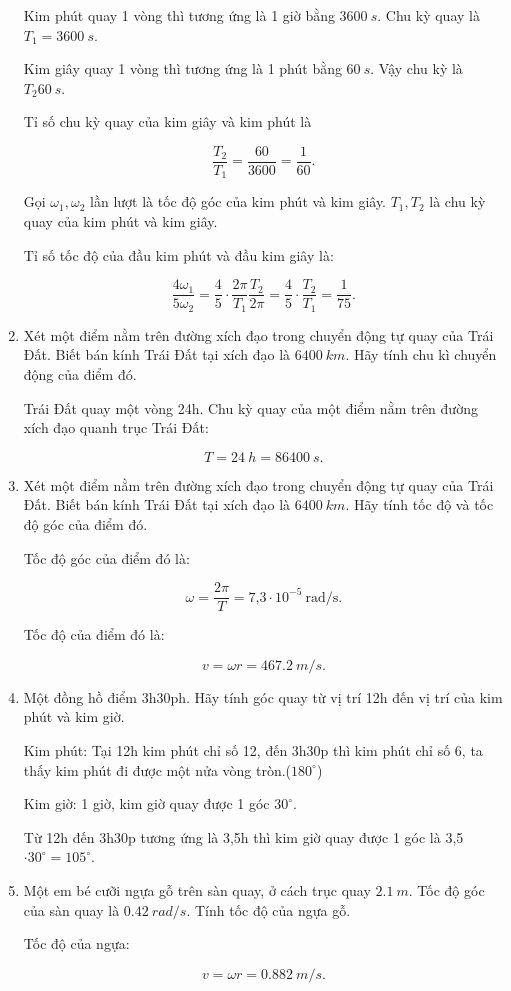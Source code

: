 \begin{enumerate}[label=\bfseries Câu \arabic*:]
	\hideall
	{	
		Kim phút quay 1 vòng thì tương ứng là 1 giờ bằng $\SI{3600}{s}$. Chu kỳ quay là $T_1=\SI{3600}{s}$.
		
		Kim giây quay 1 vòng thì tương ứng là 1 phút bằng $\SI{60}{s}$. Vậy chu kỳ là $T_2\SI{60}{s}.$
		
		Tỉ số chu kỳ quay của kim giây và kim phút là 
		
		$$\dfrac{T_2}{T_1} = \dfrac{60}{3600} = \dfrac{1}{60}.$$
		
		Gọi $\omega_1, \omega_2$ lần lượt là tốc độ góc của kim phút và kim giây. $T_1, T_2$ là chu kỳ quay của kim phút và kim giây. 
		
		Tỉ số tốc độ của đầu kim phút và đầu kim giây là:
		
		$$\dfrac{4\omega_1}{5\omega_2} = \dfrac{4}{5} \cdot \dfrac{2\pi}{T_1} \dfrac{T_2}{2\pi} = \dfrac{4}{5} \cdot \dfrac{T_2}{T_1} = \dfrac{1}{75}.$$
		
	}

		\item {}
	
	
	{
		Xét một điểm nằm trên đường xích đạo trong chuyển động tự quay của Trái Đất. Biết bán kính Trái Đất tại xích đạo là $\SI{6400}{km}.$ Hãy tính chu kì chuyển động của điểm đó.
	}
	
	\hideall
	{	
		Trái Đất quay một vòng 24h. Chu kỳ quay của một điểm nằm trên đường xích đạo quanh trục Trái Đất:
		
		$$T = \SI{24}{h} = \SI{86400}{s}.$$
		
	}
	\item {}
	
	
	{
		Xét một điểm nằm trên đường xích đạo trong chuyển động tự quay của Trái Đất. Biết bán kính Trái Đất tại xích đạo là $\SI{6400}{km}.$ Hãy tính tốc độ và tốc độ góc của điểm đó.
	}
	
	\hideall
	{	
		Tốc độ góc của điểm đó là: 
		
		$$\omega = \dfrac{2\pi}{T} = \text{7,3} \cdot 10^{-5}\ \text{rad/s}.$$
		
		Tốc độ của điểm đó là:
		
		$$v = \omega r = \SI{467,2}{m/s}.$$
	}
		\item {}
	
	
	{
		Một đồng hồ điểm 3h30ph. Hãy tính góc quay từ vị trí 12h đến vị trí của kim phút và kim giờ. 
	}
	
	\hideall
	{	
		Kim phút: Tại 12h kim phút chỉ số 12, đến 3h30p thì kim phút chỉ số 6, ta thấy kim phút đi được một nửa vòng tròn.($180^\circ$)
		
		Kim giờ: 1 giờ, kim giờ quay được 1 góc $30^\circ$. 
		
		Từ 12h đến 3h30p tương ứng là 3,5h thì kim giờ quay được 1 góc là 3,5$\cdot 30^\circ = 105^\circ.$
		
		
	}
	\item {}
	
	
	{
		Một em bé cưỡi ngựa gỗ trên sàn quay, ở cách trục quay $\SI{2,1}{m}$. Tốc độ góc của sàn quay là $\SI{0,42}{rad/s}$. Tính tốc độ của ngựa gỗ.
	}
	
	\hideall
	{	
		Tốc độ của ngựa:
		
		$$v = \omega r = \SI{0,882}{m/s}.$$
	}
\end{enumerate}